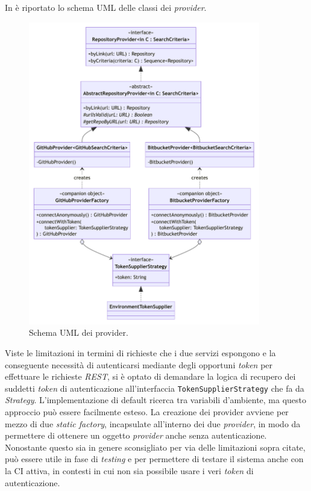 In  è riportato lo schema UML delle classi dei \textit{provider}.

\begin{figure}[h!]
    \centering
    \includegraphics[width=0.9\textwidth]{resources/img/02-provider.pdf}
    \caption{Schema UML dei provider.}
    \label{img:02-provider}
\end{figure}

Viste le limitazioni in termini di richieste che i due servizi espongono e la conseguente necessità di autenticarsi mediante degli opportuni \textit{token} per effettuare le richieste \textit{REST}, si è optato di demandare la logica di recupero dei suddetti \textit{token} di autenticazione all'interfaccia \texttt{TokenSupplierStrategy} che fa da \textit{Strategy}.
%
%
L'implementazione di default ricerca tra variabili d'ambiente, ma questo approccio può essere facilmente esteso.
%
%
La creazione dei provider avviene per mezzo di due \textit{static factory}, incapsulate all'interno dei due \textit{provider}, in modo da permettere di ottenere un oggetto \textit{provider} anche senza autenticazione.
%
Nonostante questo sia in genere sconsigliato per via delle limitazioni sopra citate, può essere utile in fase di \textit{testing} e per permettere di testare il sistema anche con la CI attiva, in contesti in cui non sia possibile usare i veri \textit{token} di autenticazione.

